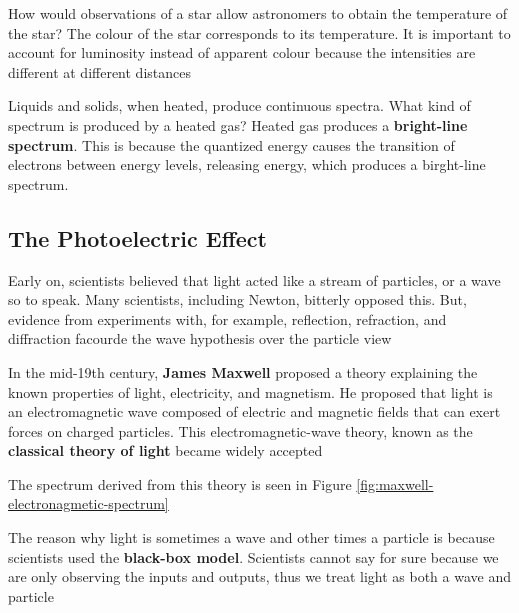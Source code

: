 \begin{sample}{How would observations of a star allow astronomers to obtain the temperature of
    the star?}
    The colour of the star corresponds to its temperature. It is important to account for luminosity
    instead of apparent colour because the intensities are different at different distances
\end{sample}

\begin{sample}{Liquids and solids, when heated, produce continuous spectra. What kind of spectrum
    is produced by a heated gas?}
    Heated gas produces a \textbf{bright-line spectrum}. This is because the quantized energy causes the transition
    of electrons between energy levels, releasing energy, which produces a birght-line spectrum.
\end{sample}

\subsection{The Photoelectric Effect}
\begin{bulleted-list}
    \item Early on, scientists believed that light acted like a stream of particles, or a wave
        so to speak. Many scientists, including Newton, bitterly opposed this. But, evidence from
        experiments with, for example, reflection, refraction, and diffraction facourde the
        wave hypothesis over the particle view
    \item In the mid-19th century, \textbf{James Maxwell} proposed a theory explaining the known
        properties of light, electricity, and magnetism. He proposed that light is an electromagnetic
        wave composed of electric and magnetic fields that can exert forces on charged particles. This
        electromagnetic-wave theory, known as the \textbf{classical theory of light} became widely
        accepted
    \item The spectrum derived from this theory is seen in Figure \ref{fig:maxwell-electronagmetic-spectrum}
\end{bulleted-list}

\begin{important}
    The reason why light is sometimes a wave and other times a particle is because scientists
    used the \textbf{black-box model}. Scientists cannot say for sure because we are only observing
    the inputs and outputs, thus we treat light as both a wave and particle
\end{important}

